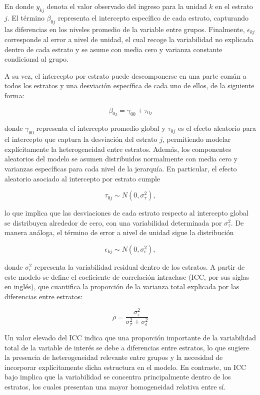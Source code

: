 \documentclass[
  spanish,
  12pt,
]{book}
\begin{document}
En donde \(y_{kj}\) denota el valor observado del ingreso para la unidad \(k\) en el estrato \(j\). El término \(\beta_{0j}\) representa el intercepto específico de cada estrato, capturando las diferencias en los niveles promedio de la variable entre grupos. Finalmente, \(\epsilon_{kj}\) corresponde al error a nivel de unidad, el cual recoge la variabilidad no explicada dentro de cada estrato y se asume con media cero y varianza constante condicional al grupo.

A su vez, el intercepto por estrato puede descomponerse en una parte común a todos los estratos y una desviación específica de cada uno de ellos, de la siguiente forma:

\[
\beta_{0j} = \gamma_{00} + \tau_{0j}
\]

donde \(\gamma_{00}\) representa el intercepto promedio global y \(\tau_{0j}\) es el efecto aleatorio para el intercepto que captura la desviación del estrato \(j\), permitiendo modelar explícitamente la heterogeneidad entre estratos. Además, los componentes aleatorios del modelo se asumen distribuidos normalmente con media cero y varianzas específicas para cada nivel de la jerarquía. En particular, el efecto aleatorio asociado al intercepto por estrato cumple

\[
\tau_{0j} \sim N\left(0, \sigma_{\tau}^{2}\right),
\]

lo que implica que las desviaciones de cada estrato respecto al intercepto global se distribuyen alrededor de cero, con una variabilidad determinada por \(\sigma_{\tau}^{2}\). De manera análoga, el término de error a nivel de unidad sigue la distribución

\[
\epsilon_{kj} \sim N\left(0, \sigma_{\epsilon}^{2}\right),
\]

donde \(\sigma_{\epsilon}^{2}\) representa la variabilidad residual dentro de los estratos. A partir de este modelo se define el coeficiente de correlación intraclase (ICC, por sus siglas en inglés), que cuantifica la proporción de la varianza total explicada por las diferencias entre estratos:

\[
\rho = \frac{\sigma_{\tau}^{2}}{\sigma_{\tau}^{2} + \sigma_{\epsilon}^{2}}
\]

Un valor elevado del ICC indica que una proporción importante de la variabilidad total de la variable de interés se debe a diferencias entre estratos, lo que sugiere la presencia de heterogeneidad relevante entre grupos y la necesidad de incorporar explícitamente dicha estructura en el modelo. En contraste, un ICC bajo implica que la variabilidad se concentra principalmente dentro de los estratos, los cuales presentan una mayor homogeneidad relativa entre sí.
\end{document}
